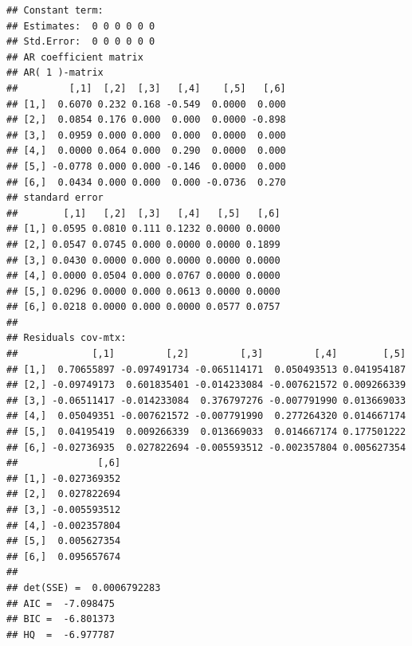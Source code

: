 \documentclass[]{article}
\begin{document}
\begin{verbatim}
## Constant term: 
## Estimates:  0 0 0 0 0 0 
## Std.Error:  0 0 0 0 0 0 
## AR coefficient matrix 
## AR( 1 )-matrix 
##         [,1]  [,2]  [,3]   [,4]    [,5]   [,6]
## [1,]  0.6070 0.232 0.168 -0.549  0.0000  0.000
## [2,]  0.0854 0.176 0.000  0.000  0.0000 -0.898
## [3,]  0.0959 0.000 0.000  0.000  0.0000  0.000
## [4,]  0.0000 0.064 0.000  0.290  0.0000  0.000
## [5,] -0.0778 0.000 0.000 -0.146  0.0000  0.000
## [6,]  0.0434 0.000 0.000  0.000 -0.0736  0.270
## standard error 
##        [,1]   [,2]  [,3]   [,4]   [,5]   [,6]
## [1,] 0.0595 0.0810 0.111 0.1232 0.0000 0.0000
## [2,] 0.0547 0.0745 0.000 0.0000 0.0000 0.1899
## [3,] 0.0430 0.0000 0.000 0.0000 0.0000 0.0000
## [4,] 0.0000 0.0504 0.000 0.0767 0.0000 0.0000
## [5,] 0.0296 0.0000 0.000 0.0613 0.0000 0.0000
## [6,] 0.0218 0.0000 0.000 0.0000 0.0577 0.0757
##   
## Residuals cov-mtx: 
##             [,1]         [,2]         [,3]         [,4]        [,5]
## [1,]  0.70655897 -0.097491734 -0.065114171  0.050493513 0.041954187
## [2,] -0.09749173  0.601835401 -0.014233084 -0.007621572 0.009266339
## [3,] -0.06511417 -0.014233084  0.376797276 -0.007791990 0.013669033
## [4,]  0.05049351 -0.007621572 -0.007791990  0.277264320 0.014667174
## [5,]  0.04195419  0.009266339  0.013669033  0.014667174 0.177501222
## [6,] -0.02736935  0.027822694 -0.005593512 -0.002357804 0.005627354
##              [,6]
## [1,] -0.027369352
## [2,]  0.027822694
## [3,] -0.005593512
## [4,] -0.002357804
## [5,]  0.005627354
## [6,]  0.095657674
##   
## det(SSE) =  0.0006792283 
## AIC =  -7.098475 
## BIC =  -6.801373 
## HQ  =  -6.977787
\end{verbatim}
\end{document}
